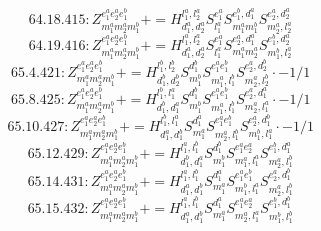 \documentclass[letterpaper,10pt,fleqn,leqno,onecolumn]{article}
\begin{document}
\begin{equation} \;\;\;\;\;\;  64.18.415: Z^{e_{1}^{a}e_{2}^{a}e_{1}^{b}}_{m_{1}^{a}m_{2}^{a}m_{1}^{b}}+=H^{l_{1}^{a},l_{2}^{a}}_{d_{1}^{a},d_{2}^{a}}S^{e_{1}^{a}}_{l_{1}^{a}}S^{e_{1}^{b},d_{1}^{a}}_{m_{1}^{a}m_{1}^{b}}S^{e_{2}^{a},d_{2}^{a}}_{m_{2}^{a},l_{2}^{a}} \end{equation}
\begin{equation} \;\;\;\;\;\;  64.19.416: Z^{e_{1}^{a}e_{2}^{a}e_{1}^{b}}_{m_{1}^{a}m_{2}^{a}m_{1}^{b}}+=H^{l_{1}^{a},l_{2}^{a}}_{d_{1}^{a},d_{2}^{a}}S^{e_{1}^{a}}_{l_{1}^{a}}S^{e_{2}^{a},d_{1}^{a}}_{m_{1}^{a}m_{2}^{a}}S^{e_{1}^{b},d_{2}^{a}}_{m_{1}^{b},l_{2}^{a}} \end{equation}
\begin{equation} \;\;\;\;\;\;  65.4.421: Z^{e_{1}^{a}e_{2}^{a}e_{1}^{b}}_{m_{1}^{a}m_{2}^{a}m_{1}^{b}}+=H^{l_{1}^{b},l_{2}^{b}}_{d_{1}^{b},d_{2}^{b}}S^{d_{1}^{b}}_{m_{1}^{b}}S^{e_{1}^{a}e_{1}^{b}}_{m_{1}^{a},l_{1}^{b}}S^{e_{2}^{a},d_{2}^{b}}_{m_{2}^{a},l_{2}^{b}}\cdot -1/1 \end{equation}
\begin{equation} \;\;\;\;\;\;  65.8.425: Z^{e_{1}^{a}e_{2}^{a}e_{1}^{b}}_{m_{1}^{a}m_{2}^{a}m_{1}^{b}}+=H^{l_{1}^{b},l_{1}^{a}}_{d_{1}^{b},d_{1}^{a}}S^{d_{1}^{b}}_{m_{1}^{b}}S^{e_{1}^{a}e_{1}^{b}}_{m_{1}^{a},l_{1}^{b}}S^{e_{2}^{a},d_{1}^{a}}_{m_{2}^{a},l_{1}^{a}}\cdot -1/1 \end{equation}
\begin{equation} \;\;\;\;\;\;  65.10.427: Z^{e_{1}^{a}e_{2}^{a}e_{1}^{b}}_{m_{1}^{a}m_{2}^{a}m_{1}^{b}}+=H^{l_{1}^{b},l_{1}^{a}}_{d_{1}^{a},d_{1}^{b}}S^{d_{1}^{a}}_{m_{1}^{a}}S^{e_{1}^{a}e_{1}^{b}}_{m_{2}^{a},l_{1}^{b}}S^{e_{2}^{a},d_{1}^{b}}_{m_{1}^{b},l_{1}^{a}}\cdot -1/1 \end{equation}
\begin{equation} \;\;\;\;\;\;  65.12.429: Z^{e_{1}^{a}e_{2}^{a}e_{1}^{b}}_{m_{1}^{a}m_{2}^{a}m_{1}^{b}}+=H^{l_{1}^{a},l_{1}^{b}}_{d_{1}^{b},d_{1}^{a}}S^{d_{1}^{b}}_{m_{1}^{b}}S^{e_{1}^{a}e_{2}^{a}}_{m_{1}^{a},l_{1}^{a}}S^{e_{1}^{b},d_{1}^{a}}_{m_{2}^{a},l_{1}^{b}} \end{equation}
\begin{equation} \;\;\;\;\;\;  65.14.431: Z^{e_{1}^{a}e_{2}^{a}e_{1}^{b}}_{m_{1}^{a}m_{2}^{a}m_{1}^{b}}+=H^{l_{1}^{a},l_{1}^{b}}_{d_{1}^{a},d_{1}^{b}}S^{d_{1}^{a}}_{m_{1}^{a}}S^{e_{1}^{a}e_{1}^{b}}_{m_{1}^{b},l_{1}^{a}}S^{e_{2}^{a},d_{1}^{b}}_{m_{2}^{a},l_{1}^{b}} \end{equation}
\begin{equation} \;\;\;\;\;\;  65.15.432: Z^{e_{1}^{a}e_{2}^{a}e_{1}^{b}}_{m_{1}^{a}m_{2}^{a}m_{1}^{b}}+=H^{l_{1}^{a},l_{1}^{b}}_{d_{1}^{a},d_{1}^{b}}S^{d_{1}^{a}}_{m_{1}^{a}}S^{e_{1}^{a}e_{2}^{a}}_{m_{2}^{a},l_{1}^{a}}S^{e_{1}^{b},d_{1}^{b}}_{m_{1}^{b},l_{1}^{b}} \end{equation}
\end{document}
